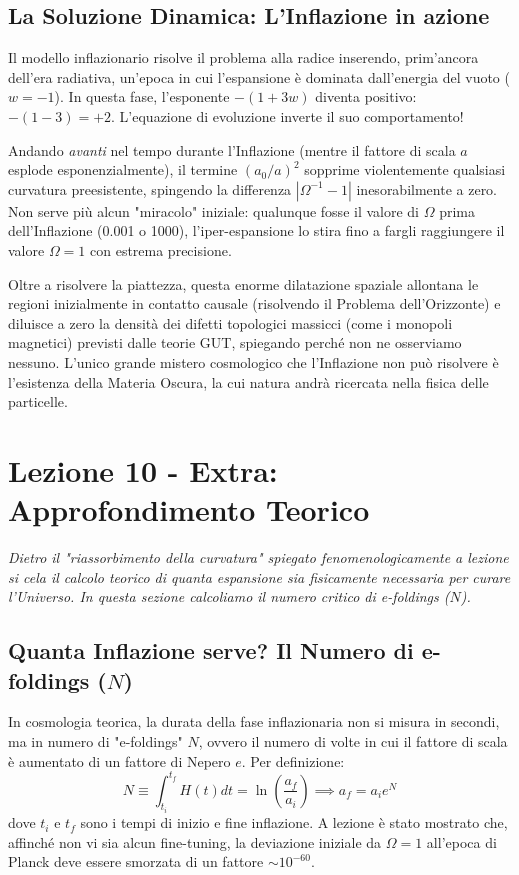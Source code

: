 \documentclass[11pt,a4paper]{report}
\begin{document}
\subsection{La Soluzione Dinamica: L'Inflazione in azione}
Il modello inflazionario risolve il problema alla radice inserendo, prim'ancora dell'era radiativa, un'epoca in cui l'espansione è dominata dall'energia del vuoto ($w = -1$). 
In questa fase, l'esponente $-(1+3w)$ diventa positivo: $-(1 - 3) = +2$. L'equazione di evoluzione inverte il suo comportamento!

Andando \textit{avanti} nel tempo durante l'Inflazione (mentre il fattore di scala $a$ esplode esponenzialmente), il termine $(a_0/a)^2$ sopprime violentemente qualsiasi curvatura preesistente, spingendo la differenza $|\Omega^{-1} - 1|$ inesorabilmente a zero. 
Non serve più alcun "miracolo" iniziale: qualunque fosse il valore di $\Omega$ prima dell'Inflazione (0.001 o 1000), l'iper-espansione lo stira fino a fargli raggiungere il valore $\Omega = 1$ con estrema precisione. 

Oltre a risolvere la piattezza, questa enorme dilatazione spaziale allontana le regioni inizialmente in contatto causale (risolvendo il Problema dell'Orizzonte) e diluisce a zero la densità dei difetti topologici massicci (come i monopoli magnetici) previsti dalle teorie GUT, spiegando perché non ne osserviamo nessuno. L'unico grande mistero cosmologico che l'Inflazione non può risolvere è l'esistenza della Materia Oscura, la cui natura andrà ricercata nella fisica delle particelle.


\newpage
\section{Lezione 10 - Extra: Approfondimento Teorico}

\textit{Dietro il "riassorbimento della curvatura" spiegato fenomenologicamente a lezione si cela il calcolo teorico di quanta espansione sia fisicamente necessaria per curare l'Universo. In questa sezione calcoliamo il numero critico di e-foldings ($N$).}

\subsection{Quanta Inflazione serve? Il Numero di e-foldings ($N$)}
In cosmologia teorica, la durata della fase inflazionaria non si misura in secondi, ma in numero di "e-foldings" $N$, ovvero il numero di volte in cui il fattore di scala è aumentato di un fattore di Nepero $e$. Per definizione:
\begin{equation}
N \equiv \int_{t_i}^{t_f} H(t) dt = \ln \left( \frac{a_f}{a_i} \right) \implies a_f = a_i e^N
\end{equation}
dove $t_i$ e $t_f$ sono i tempi di inizio e fine inflazione.
A lezione è stato mostrato che, affinché non vi sia alcun fine-tuning, la deviazione iniziale da $\Omega=1$ all'epoca di Planck deve essere smorzata di un fattore $\sim 10^{-60}$. 
\end{document}
